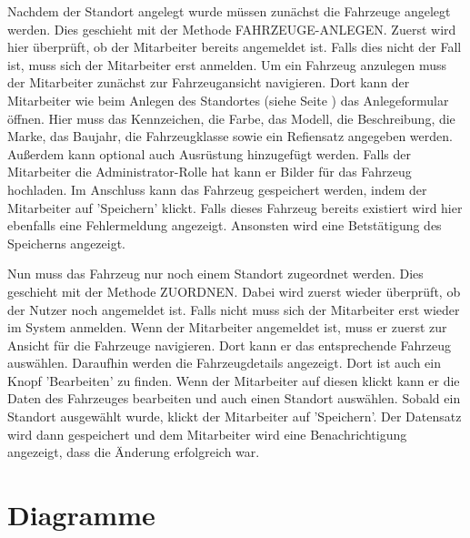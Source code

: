 

Nachdem der Standort angelegt wurde müssen zunächst die Fahrzeuge angelegt werden. Dies geschieht mit der Methode FAHRZEUGE-ANLEGEN. Zuerst wird hier überprüft, ob der Mitarbeiter bereits angemeldet ist. Falls dies nicht der Fall ist, muss sich der Mitarbeiter erst anmelden. Um ein Fahrzeug anzulegen muss der Mitarbeiter zunächst zur Fahrzeugansicht navigieren. Dort kann der Mitarbeiter wie beim Anlegen des Standortes (siehe Seite \pageref{code:StandortAnlegen}) das Anlegeformular öffnen. Hier muss das Kennzeichen, die Farbe, das Modell, die Beschreibung, die Marke, das Baujahr, die Fahrzeugklasse sowie ein Refiensatz angegeben werden. Außerdem kann optional auch Ausrüstung hinzugefügt werden. Falls der Mitarbeiter die Administrator-Rolle hat kann er Bilder für das Fahrzeug hochladen. Im Anschluss kann das Fahrzeug gespeichert werden, indem der Mitarbeiter auf 'Speichern' klickt. Falls dieses Fahrzeug bereits existiert wird hier ebenfalls eine Fehlermeldung angezeigt. Ansonsten wird eine Betstätigung des Speicherns angezeigt.



Nun muss das Fahrzeug nur noch einem Standort zugeordnet werden. Dies geschieht mit der Methode ZUORDNEN. Dabei wird zuerst wieder überprüft, ob der Nutzer noch angemeldet ist. Falls nicht muss sich der Mitarbeiter erst wieder im System anmelden. Wenn der Mitarbeiter angemeldet ist, muss er zuerst zur Ansicht für die Fahrzeuge navigieren. Dort kann er das entsprechende Fahrzeug auswählen. Daraufhin werden die Fahrzeugdetails angezeigt. Dort ist auch ein Knopf 'Bearbeiten' zu finden. Wenn der Mitarbeiter auf diesen klickt kann er die Daten des Fahrzeuges bearbeiten und auch einen Standort auswählen. Sobald ein Standort ausgewählt wurde, klickt der Mitarbeiter auf 'Speichern'. Der Datensatz wird dann gespeichert und dem Mitarbeiter wird eine Benachrichtigung angezeigt, dass die Änderung erfolgreich war.


\newpage

\section{Diagramme}

